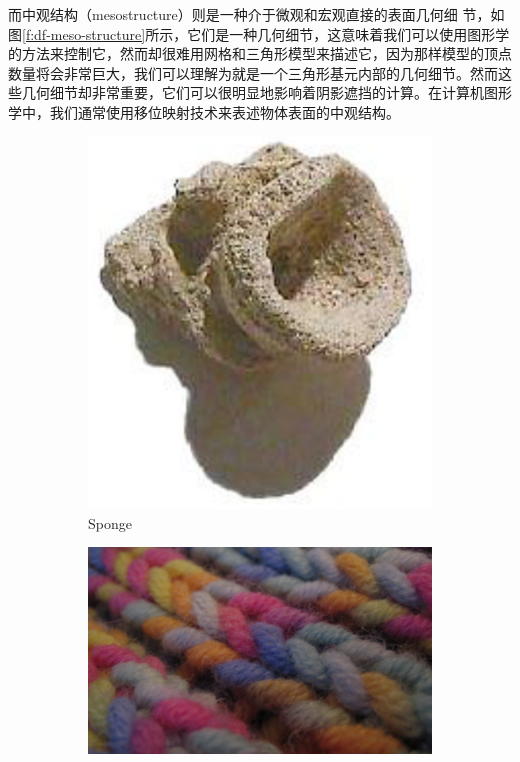 而中观结构（mesostructure）则是一种介于微观和宏观直接的表面几何细 节，如图\ref{f:df-meso-structure}所示，它们是一种几何细节，这意味着我们可以使用图形学的方法来控制它，然而却很难用网格和三角形模型来描述它，因为那样模型的顶点数量将会非常巨大，我们可以理解为就是一个三角形基元内部的几何细节。然而这些几何细节却非常重要，它们可以很明显地影响着阴影遮挡的计算。在计算机图形学中，我们通常使用移位映射技术来表述物体表面的中观结构。

\begin{figure}
\begin{fullwidth}
	\begin{subfigure}[t]{0.17\thewidth}
		\includegraphics[width=\textwidth]{graphics/df/meso-structure-1}
		\caption{Sponge}
	\end{subfigure}
	\begin{subfigure}[t]{.285\thewidth}
		\includegraphics[width=\textwidth]{graphics/df/meso-structure-2}

\end{subfigure}
\end{fullwidth}
\end{figure}
